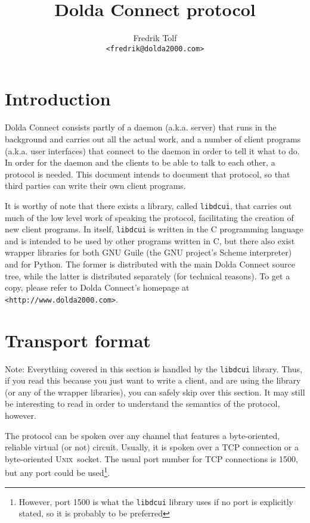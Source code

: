 \documentclass[twoside,a4paper,11pt]{article}
\title{Dolda Connect protocol}
\author{Fredrik Tolf\\\texttt{<fredrik@dolda2000.com>}}
\newcommand{\urlink}[1]{\texttt{<#1>}}
\newcommand{\unix}{\textsc{Unix}}
\begin{document}
\maketitle

\tableofcontents

\section{Introduction}
Dolda Connect consists partly of a daemon (a.k.a. server) that runs in
the background and carries out all the actual work, and a number of
client programs (a.k.a. user interfaces) that connect to the daemon in
order to tell it what to do. In order for the daemon and the clients
to be able to talk to each other, a protocol is needed. This document
intends to document that protocol, so that third parties can write
their own client programs.

It is worthy of note that there exists a library, called
\texttt{libdcui}, that carries out much of the low level work of
speaking the protocol, facilitating the creation of new client
programs. In itself, \texttt{libdcui} is written in the C programming
language and is intended to be used by other programs written in C,
but there also exist wrapper libraries for both GNU Guile (the GNU
project's Scheme interpreter) and for Python. The former is
distributed with the main Dolda Connect source tree, while the latter
is distributed separately (for technical reasons). To get a copy,
please refer to Dolda Connect's homepage at
\urlink{http://www.dolda2000.com}.

\section{Transport format}
Note: Everything covered in this section is handled by the
\texttt{libdcui} library. Thus, if you read this because you just want
to write a client, and are using the library (or any of the wrapper
libraries), you can safely skip over this section. It may still be
interesting to read in order to understand the semantics of the
protocol, however.

The protocol can be spoken over any channel that features a
byte-oriented, reliable virtual (or not) circuit. Usually, it is
spoken over a TCP connection or a byte-oriented \unix\ socket. The
usual port number for TCP connections is 1500, but any port could be
used\footnote{However, port 1500 is what the \texttt{libdcui} library
  uses if no port is explicitly stated, so it is probably to be
  preferred}.
\end{document}
